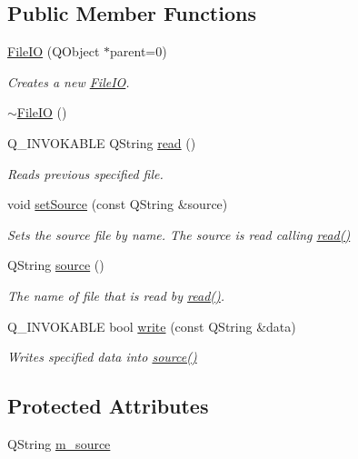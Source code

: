 \subsection*{Public Member Functions}
\begin{DoxyCompactItemize}
\item 
\hyperlink{class_file_i_o_a6e4f7122f89b633e3522c2e1d31e1fdd}{File\+I\+O} (Q\+Object $\ast$parent=0)
\begin{DoxyCompactList}\small\item\em Creates a new \hyperlink{class_file_i_o}{File\+I\+O}. \end{DoxyCompactList}\item 
\hyperlink{class_file_i_o_adc3caa8f1e5d76274d8ffb8b5c17288b}{$\sim$\+File\+I\+O} ()
\item 
Q\+\_\+\+I\+N\+V\+O\+K\+A\+B\+L\+E Q\+String \hyperlink{class_file_i_o_a48c90efc3bf8dda4d612f2dff5409834}{read} ()
\begin{DoxyCompactList}\small\item\em Reads previous specified file. \end{DoxyCompactList}\item 
void \hyperlink{class_file_i_o_a985a2cce4d400bca160c5f42bf697adb}{set\+Source} (const Q\+String \&source)
\begin{DoxyCompactList}\small\item\em Sets the source file by name. The source is read calling \hyperlink{class_file_i_o_a48c90efc3bf8dda4d612f2dff5409834}{read()} \end{DoxyCompactList}\item 
Q\+String \hyperlink{class_file_i_o_a8da2b4c6cd72af512e4556203c1c66e7}{source} ()
\begin{DoxyCompactList}\small\item\em The name of file that is read by \hyperlink{class_file_i_o_a48c90efc3bf8dda4d612f2dff5409834}{read()}. \end{DoxyCompactList}\item 
Q\+\_\+\+I\+N\+V\+O\+K\+A\+B\+L\+E bool \hyperlink{class_file_i_o_a73bc6cac958f024325e795a690740a85}{write} (const Q\+String \&data)
\begin{DoxyCompactList}\small\item\em Writes specified data into \hyperlink{class_file_i_o_a8da2b4c6cd72af512e4556203c1c66e7}{source()} \end{DoxyCompactList}\end{DoxyCompactItemize}
\subsection*{Protected Attributes}
\begin{DoxyCompactItemize}
\item 
Q\+String \hyperlink{class_file_i_o_ab8f8edbc97eec6d3cf77e314a8754ef3}{m\+\_\+source}
\end{DoxyCompactItemize}


